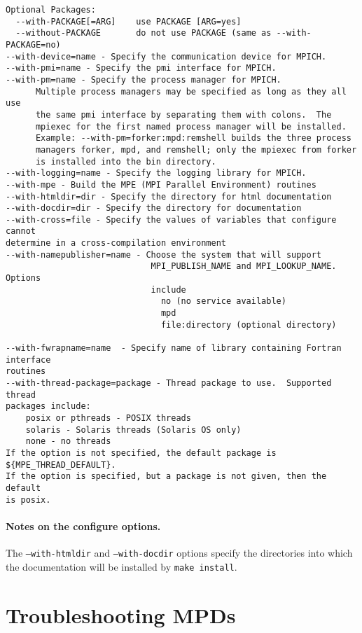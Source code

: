\documentclass[dvipdfm,11pt]{article}
\begin{document}
\begin{small}
\begin{verbatim}
Optional Packages:
  --with-PACKAGE[=ARG]    use PACKAGE [ARG=yes]
  --without-PACKAGE       do not use PACKAGE (same as --with-PACKAGE=no)
--with-device=name - Specify the communication device for MPICH.
--with-pmi=name - Specify the pmi interface for MPICH.
--with-pm=name - Specify the process manager for MPICH.
      Multiple process managers may be specified as long as they all use
      the same pmi interface by separating them with colons.  The
      mpiexec for the first named process manager will be installed.
      Example: --with-pm=forker:mpd:remshell builds the three process
      managers forker, mpd, and remshell; only the mpiexec from forker
      is installed into the bin directory.
--with-logging=name - Specify the logging library for MPICH.
--with-mpe - Build the MPE (MPI Parallel Environment) routines
--with-htmldir=dir - Specify the directory for html documentation
--with-docdir=dir - Specify the directory for documentation
--with-cross=file - Specify the values of variables that configure cannot
determine in a cross-compilation environment
--with-namepublisher=name - Choose the system that will support
                             MPI_PUBLISH_NAME and MPI_LOOKUP_NAME.  Options
                             include
                               no (no service available)
                               mpd
                               file:directory (optional directory)

--with-fwrapname=name  - Specify name of library containing Fortran interface
routines
--with-thread-package=package - Thread package to use.  Supported thread
packages include:
    posix or pthreads - POSIX threads
    solaris - Solaris threads (Solaris OS only)
    none - no threads
If the option is not specified, the default package is ${MPE_THREAD_DEFAULT}.
If the option is specified, but a package is not given, then the default
is posix.
\end{verbatim}
\end{small}

\paragraph{Notes on the configure options.}
The \texttt{--with-htmldir} and \texttt{--with-docdir} options specify the 
directories into which the documentation will be installed by \texttt{make
  install}. 

\appendix


\section{Troubleshooting MPDs}
\label{app:mpd}
\end{document}
